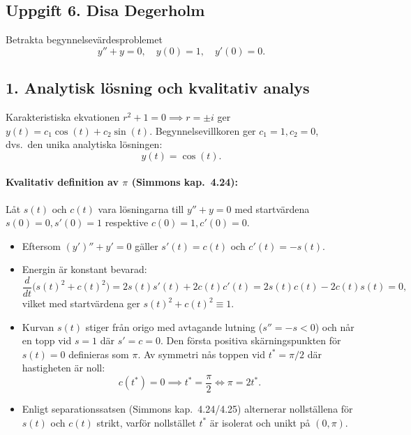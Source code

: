 \documentclass{article}
\begin{document}
\subsection*{Uppgift 6. Disa Degerholm}


Betrakta begynnelsevärdesproblemet
\begin{equation}
    y'' + y = 0, \quad y(0) = 1, \quad y'(0) = 0.
\end{equation}

\subsection*{1. Analytisk lösning och kvalitativ analys}
Karakteristiska ekvationen $r^2 + 1 = 0 \implies r = \pm i$ ger $y(t) = c_1 \cos(t) + c_2 \sin(t)$. Begynnelsevillkoren ger $c_1 = 1, c_2 = 0$, dvs.\ den unika analytiska lösningen:
\begin{equation}
    y(t) = \cos(t).
\end{equation}

\paragraph{Kvalitativ definition av $\pi$ (Simmons kap.~4.24):}
Låt $s(t)$ och $c(t)$ vara lösningarna till $y'' + y = 0$ med startvärdena $s(0) = 0, s'(0) = 1$ respektive $c(0) = 1, c'(0) = 0$.
\begin{itemize}
    \item Eftersom $(y')'' + y' = 0$ gäller $s'(t) = c(t)$ och $c'(t) = -s(t)$.
    \item Energin är konstant bevarad:
    \begin{equation}
        \frac{d}{dt}\big(s(t)^2 + c(t)^2\big) = 2s(t)s'(t) + 2c(t)c'(t) = 2s(t)c(t) - 2c(t)s(t) = 0,
    \end{equation}
    vilket med startvärdena ger $s(t)^2 + c(t)^2 \equiv 1$.
    \item Kurvan $s(t)$ stiger från origo med avtagande lutning ($s'' = -s < 0$) och når en topp vid $s = 1$ där $s' = c = 0$. Den första positiva skärningspunkten för $s(t) = 0$ definieras som $\pi$. Av symmetri nås toppen vid $t^* = \pi/2$ där hastigheten är noll:
    \begin{equation}
        c(t^*) = 0 \implies t^* = \frac{\pi}{2} \iff \pi = 2t^*.
    \end{equation}
    \item Enligt separationssatsen (Simmons kap.~4.24/4.25) alternerar nollställena för $s(t)$ och $c(t)$ strikt, varför nollstället $t^*$ är isolerat och unikt på $(0, \pi)$.
\end{itemize}
\end{document}
